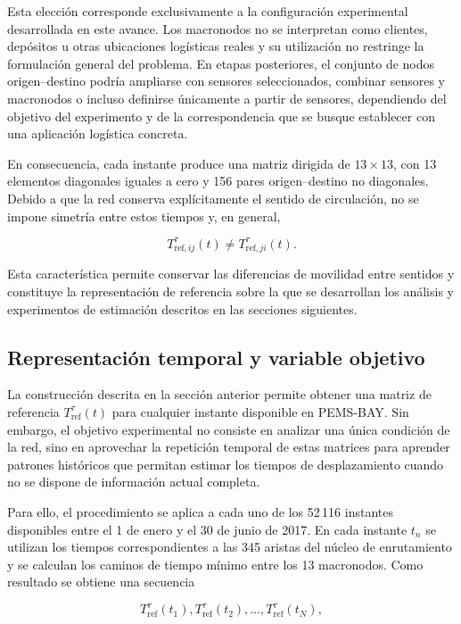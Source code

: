 \documentclass[11pt]{article}
\begin{document}
Esta elección corresponde exclusivamente a la configuración experimental desarrollada en este avance. Los macronodos no se interpretan como clientes, depósitos u otras ubicaciones logísticas reales y su utilización no restringe la formulación general del problema. En etapas posteriores, el conjunto de nodos origen--destino podría ampliarse con sensores seleccionados, combinar sensores y macronodos o incluso definirse únicamente a partir de sensores, dependiendo del objetivo del experimento y de la correspondencia que se busque establecer con una aplicación logística concreta.

En consecuencia, cada instante produce una matriz dirigida de $13\times13$, con 13 elementos diagonales iguales a cero y 156 pares origen--destino no diagonales. Debido a que la red conserva explícitamente el sentido de circulación, no se impone simetría entre estos tiempos y, en general,

\[
T^\tau_{\mathrm{ref},ij}(t)
\neq
T^\tau_{\mathrm{ref},ji}(t).
\]

Esta característica permite conservar las diferencias de movilidad entre sentidos y constituye la representación de referencia sobre la que se desarrollan los análisis y experimentos de estimación descritos en las secciones siguientes.

\subsection{Representación temporal y variable objetivo}

La construcción descrita en la sección anterior permite obtener una matriz de referencia $T^{\tau}_{\mathrm{ref}}(t)$ para cualquier instante disponible en PEMS-BAY. Sin embargo, el objetivo experimental no consiste en analizar una única condición de la red, sino en aprovechar la repetición temporal de estas matrices para aprender patrones históricos que permitan estimar los tiempos de desplazamiento cuando no se dispone de información actual completa.

Para ello, el procedimiento se aplica a cada uno de los 52\,116 instantes disponibles entre el 1 de enero y el 30 de junio de 2017. En cada instante $t_n$ se utilizan los tiempos correspondientes a las 345 aristas del núcleo de enrutamiento y se calculan los caminos de tiempo mínimo entre los 13 macronodos. Como resultado se obtiene una secuencia

\[
T^{\tau}_{\mathrm{ref}}(t_1),
T^{\tau}_{\mathrm{ref}}(t_2),
\ldots,
T^{\tau}_{\mathrm{ref}}(t_N),
\]
\end{document}
